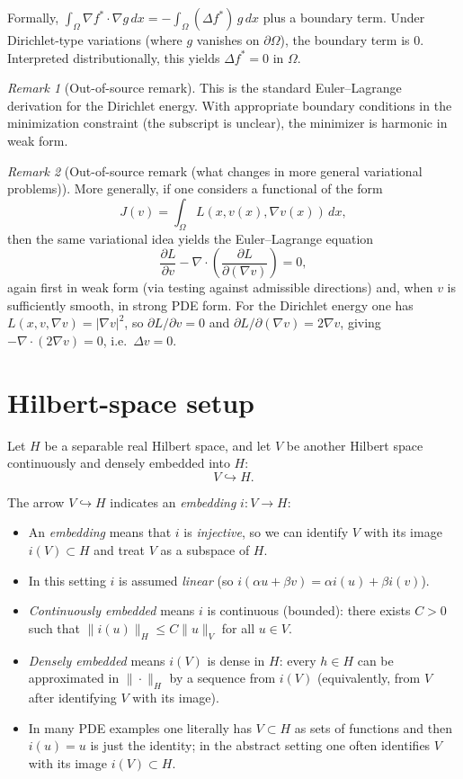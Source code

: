 \documentclass[11pt]{article}
\theoremstyle{definition}
\theoremstyle{remark}
\newtheorem{remark}{Remark}
\begin{document}
Formally, $\int_\Omega \nabla f^\ast\cdot\nabla g\,dx=-\int_\Omega (\Delta f^\ast)\,g\,dx$ plus a boundary term. Under Dirichlet-type variations (where $g$ vanishes on $\partial\Omega$), the boundary term is $0$. Interpreted distributionally, this yields $\Delta f^\ast=0$ in $\Omega$.

\begin{remark}[Out-of-source remark]
This is the standard Euler--Lagrange derivation for the Dirichlet energy. With appropriate boundary conditions in the minimization constraint (the subscript is unclear), the minimizer is harmonic in weak form.
\end{remark}

\begin{remark}[Out-of-source remark (what changes in more general variational problems)]
More generally, if one considers a functional of the form
\[
J(v)=\int_\Omega L(x,v(x),\nabla v(x))\,dx,
\]
then the same variational idea yields the Euler--Lagrange equation
\[
\frac{\partial L}{\partial v}
-\nabla\cdot\left(\frac{\partial L}{\partial(\nabla v)}\right)
=0,
\]
again first in weak form (via testing against admissible directions) and, when $v$ is sufficiently smooth, in strong PDE form. For the Dirichlet energy one has $L(x,v,\nabla v)=|\nabla v|^2$, so $\partial L/\partial v=0$ and $\partial L/\partial(\nabla v)=2\nabla v$, giving $-\nabla\cdot(2\nabla v)=0$, i.e.\ $\Delta v=0$.
\end{remark}

\section*{Hilbert-space setup}

Let $H$ be a separable real Hilbert space, and let $V$ be another Hilbert space continuously and densely embedded into $H$:
\[
V\hookrightarrow H.
\]

\noindent
The arrow $V\hookrightarrow H$ indicates an \emph{embedding} $i:V\to H$:
\begin{itemize}
\item An \emph{embedding} means that $i$ is \emph{injective}, so we can identify $V$ with its image $i(V)\subset H$ and treat $V$ as a subspace of $H$.
\item In this setting $i$ is assumed \emph{linear} (so $i(\alpha u+\beta v)=\alpha i(u)+\beta i(v)$).
\item \emph{Continuously embedded} means $i$ is continuous (bounded): there exists $C>0$ such that $\|i(u)\|_H\le C\|u\|_V$ for all $u\in V$.
\item \emph{Densely embedded} means $i(V)$ is dense in $H$: every $h\in H$ can be approximated in $\|\cdot\|_H$ by a sequence from $i(V)$ (equivalently, from $V$ after identifying $V$ with its image).
\item In many PDE examples one literally has $V\subset H$ as sets of functions and then $i(u)=u$ is just the identity; in the abstract setting one often identifies $V$ with its image $i(V)\subset H$.
\end{itemize}
\end{document}

